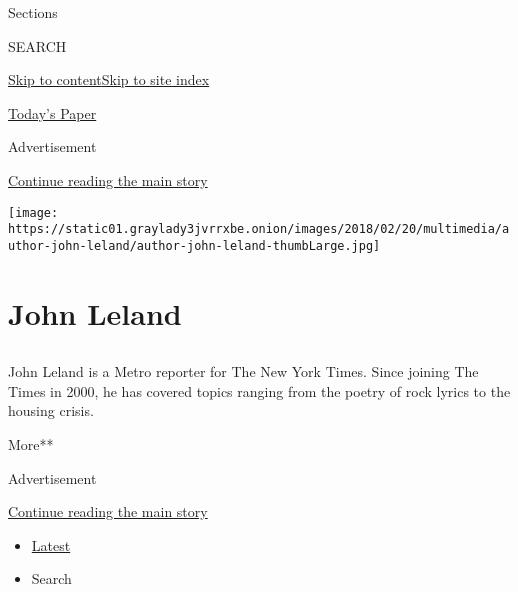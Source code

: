 Sections

SEARCH

\protect\hyperlink{site-content}{Skip to
content}\protect\hyperlink{site-index}{Skip to site index}

\href{https://myaccount.nytimes3xbfgragh.onion/auth/login?response_type=cookie\&client_id=vi}{}

\href{https://www.nytimes3xbfgragh.onion/section/todayspaper}{Today's
Paper}

Advertisement

\protect\hyperlink{after-top}{Continue reading the main story}

\texttt{[image: https://static01.graylady3jvrrxbe.onion/images/2018/02/20/multimedia/author-john-leland/author-john-leland-thumbLarge.jpg]}

\hypertarget{john-leland}{%
\section{John Leland}\label{john-leland}}

\subsection{}

John Leland is a Metro reporter for The New York Times. Since joining
The Times in 2000, he has covered topics ranging from the poetry of rock
lyrics to the housing crisis.

More**

Advertisement

\protect\hyperlink{after-mid1}{Continue reading the main story}

\begin{itemize}
\tightlist
\item
  \protect\hyperlink{stream-panel}{Latest}
\item
  Search
\end{itemize}

